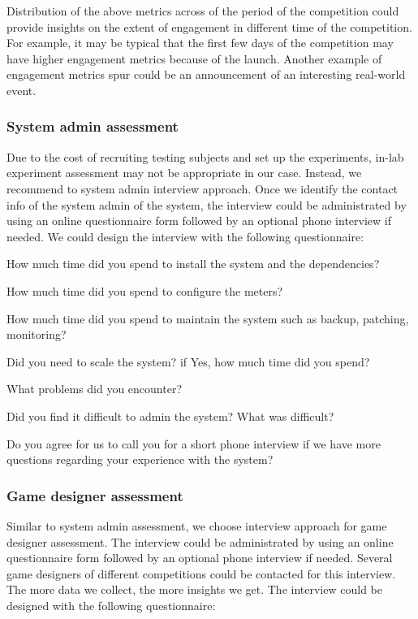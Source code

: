 \documentclass[11pt]{article}
\begin{document}
Distribution of the above metrics across of the period of the competition could provide insights on 
the extent of engagement in different time of the competition. For example, it may be typical that
the first few days of the competition may have higher engagement metrics because of the launch. Another
example of engagement metrics spur could be an announcement of an interesting real-world event. 
    
\subsubsection{System admin assessment}

Due to the cost of recruiting testing subjects and set up the experiments, in-lab experiment assessment may not be appropriate in our case. Instead, we recommend to system admin interview approach. Once we identify the contact info of the system admin of the system, the interview could be administrated by using an online questionnaire form followed by an optional phone interview if needed. We could design the interview with the following questionnaire:

\begin{compactitem}
\item How much time did you spend to install the system and the dependencies?
\item How much time did you spend to configure the meters?
\item How much time did you spend to maintain the system such as backup, patching, monitoring?
\item Did you need to scale the system? if Yes, how much time did you spend?
\item What problems did you encounter?
\item Did you find it difficult to admin the system? What was difficult?
\item Do you agree for us to call you for a short phone interview if we have more questions regarding your experience with the system?
\end{compactitem}

\subsubsection{Game designer assessment}
Similar to system admin assessment, we choose interview approach for game designer assessment. The interview could be administrated by using an online questionnaire form followed by an optional phone interview if needed. Several game designers of different competitions could be contacted for this interview. The more data we collect, the more insights we get. The interview could be designed with the following questionnaire:
\end{document}
